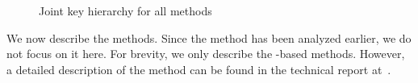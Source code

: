 \begin{figure}[!h]
\scalebox{.75}{

}
\caption{Joint key hierarchy for all methods}
\label{fig:kdfdiagram}
\end{figure}

We now describe the \mEdhoc{} methods.
%
Since the \mSigSig{} method has been analyzed earlier, we do not focus on
it here.
%
For brevity, we only describe the \mStat-based methods.
%
However, a detailed description of the \mPskPsk{} method can be found in the
technical report at~\cite{edhocTamarinRepo}. 
%

%
%
